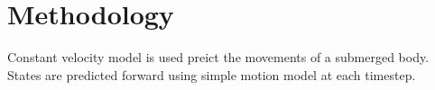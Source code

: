 \chapter{Methodology} \label{chap:methodology}
Constant velocity model is used preict the movements of a submerged body. States are predicted forward using simple motion model at each timestep.  